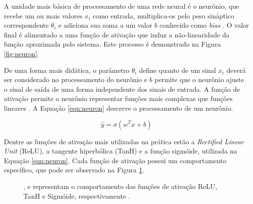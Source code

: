 A unidade mais básica de processamento de uma rede neural é o neurônio, que recebe um ou mais valores $x_i$ como entrada, multiplica-os pelo peso sináptico correspondente $\theta_i$ e adiciona sua soma a um valor $b$ conhecido como \textit{bias} \cite{Goodfellow2016}. O valor final é alimentado a uma função de ativação que induz a não-linearidade da função aproximada pelo sistema. Este processo é demonstrado na Figura \ref{fig:neuron}.

De uma forma mais didática, o parâmetro $\theta_i$ define quanto de um sinal $x_i$ deverá ser considerado no processamento do neurônio e $b$ permite que o neurônio ajuste o sinal de saída de uma forma independente dos sinais de entrada. A função de ativação permite o neurônio representar funções mais complexas que funções lineares \cite{Luckeciano}. A Equação \ref{eqn:neuron} descreve o processamento de um neurônio.

\begin{equation}
\label{eqn:neuron}
\hat{y} = \sigma(w^Tx+b)
\end{equation}

Dentre as funções de ativação mais utilizadas na prática estão a \textit{Rectified Linear Unit} (ReLU), a tangente hiperbólica (TanH) e a função sigmóide, utilizada na Equação \ref{eqn:neuron}. Cada função de ativação possui um comportamento específico, que pode ser observado na Figura \ref{fig:activationfunctions}.

\begin{figure}[ht]
 \centering
   \captionsetup{width=1\textwidth}
   \caption{{}, {} e {} representam o comportamento das funções de ativação ReLU, TanH e Sigmóide, respectivamente \cite{Luckeciano}.}
  \label{fig:activationfunctions}
\end{figure}

